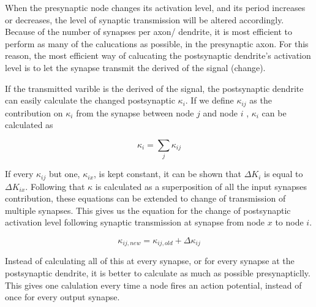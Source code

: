 	When the presynaptic node changes its activation level, and its period increases or decreases, the level of synaptic transmission will be altered accordingly. 
	Because of the number of synapses per axon/ dendrite, it is most efficient to perform as many of the calucations as possible, in the presynaptic axon.
	For this reason, the most efficient way of calucating the postsynaptic dendrite's activation level is to let the synapse transmit the derived of the signal (change).

	If the transmitted varible is the derived of the signal, the postsynaptic dendrite can easily calculate the changed postsynaptic $\kappa_i$. 
	If we define $\kappa_{ij}$ as the contribution on $\kappa_i$ from the synapse between node $j$ and node $i$ , $\kappa_i$ can be calculated as

	\begin{equation}
		\kappa_{i} = \sum_j{\kappa_{ij}}
	\end{equation}
	
	If every $\kappa_{ij}$ but one, $\kappa_{ix}$, is kept constant, it can be shown that $\Delta K_i$ is equal to $\Delta K_{ix}$.
	Following that $\kappa$ is calculated as a superposition of all the input synapses contribution, these equations can be extended to change of transmission of multiple synapses.
	This gives us the equation for the change of postsynaptic activation level following synaptic transmission at synapse from node $x$ to node $i$.

	\begin{equation}
		\kappa_{ij, new} = \kappa_{ij, old} + \Delta \kappa_{ij}
	\end{equation}

	Instead of calculating all of this at every synapse, or for every synapse at the postsynaptic dendrite, it is better to calculate as much as possible presynapticlly.
	This gives one calulation every time a node fires an action potential, instead of once for every output synapse.

	



